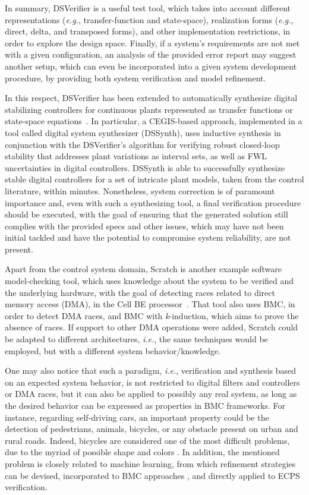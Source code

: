 \documentclass[format=acmsmall, review=false, screen=true]{acmart}
\begin{document}
In summary, DSVerifier is a useful test tool, which takes into account different representations ({\it e.g.}, transfer-function and state-space), realization forms ({\it e.g.}, direct, delta, and transposed forms), and other implementation restrictions, in order to explore the design space. Finally, if a system's requirements are not met with a given configuration, an analysis of the provided error report may suggest another setup, which can even be incorporated into a given system development procedure, by providing both system verification and model refinement. 

In this respect, DSVerifier has been extended to automatically synthesize digital stabilizing controllers for continuous plants represented as transfer functions or state-space equations~\cite{Abate17,abatecav2017}. In particular, a CEGIS-based approach, implemented in a tool called digital system synthesizer (DSSynth), uses inductive synthesis in conjunction with the DSVerifier's algorithm for verifying robust closed-loop stability that addresses plant variations as interval sets, as well as FWL uncertainties in digital controllers. DSSynth is able to successfully synthesize stable digital controllers for a set of intricate plant models, taken from the control literature, within minutes. Nonetheless, system correction is of paramount importance and, even with such a synthesizing tool, a final verification procedure should be executed, with the goal of ensuring that the generated solution still complies with the provided specs and other issues, which may have not been initial tackled and have the potential to compromise system reliability, are not present.

Apart from the control system domain, Scratch is another example software model-checking tool, which uses knowledge about the system to be verified and the underlying hardware, with the goal of detecting races related to direct memory access (DMA), in the Cell BE processor~\cite{Donaldson10}. That tool also uses BMC, in order to detect DMA races, and BMC with \textit{k}-induction, which aims to prove the absence of races. If support to other DMA operations were added, Scratch could be adapted to different architectures, {\it i.e.}, the same techniques would be employed, but with a different system behavior/knowledge.

One may also notice that such a paradigm, {\it i.e.}, verification and synthesis based on an expected system behavior, is not restricted to digital filters and controllers or DMA races, but it can also be applied to possibly any real system, as long as the desired behavior can be expressed as properties in BMC frameworks. For instance, regarding self-driving cars, an important property could be the detection of pedestrians, animals, bicycles, or any obstacle present on urban and rural roads. Indeed, bicycles are considered one of the most difficult problems, due to the myriad of possible shape and colors \cite{selfcar}. In addition, the mentioned problem is closely related to machine learning, from which refinement strategies can be devised, incorporated to BMC approaches \cite{BMCml}, and directly applied to ECPS verification.
\end{document}
